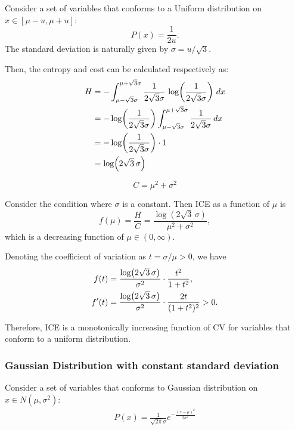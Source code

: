 \documentclass[11pt]{article}
\theoremstyle{remark}
\theoremstyle{definition}
\begin{document}
Consider a set of variables that conforms to a Uniform distribution on $x \in [\mu-u,\mu+u]$:
\begin{equation}
    P(x) = \frac{1}{2u}.
\end{equation}
The standard deviation is naturally given by $\sigma = u/\sqrt{3}$.

Then, the entropy and cost can be calculated respectively as: 
\begin{align}
H 
&= -\int_{\mu-\sqrt{3}\sigma}^{\mu+\sqrt{3}\sigma}
\frac{1}{2\sqrt{3}\sigma}\,
\log\!\left(\frac{1}{2\sqrt{3}\sigma}\right)\,dx \notag \\
&= -\log\!\left(\frac{1}{2\sqrt{3}\sigma}\right)
\int_{\mu-\sqrt{3}\sigma}^{\mu+\sqrt{3}\sigma}\frac{1}{2\sqrt{3}\sigma}\,dx \notag \\
&= -\log\!\left(\frac{1}{2\sqrt{3}\sigma}\right)\cdot 1 \notag \\
&= \log\!\left(2\sqrt{3}\,\sigma\right)
\end{align}

\begin{equation}
C = \mu^2 + \sigma^2
\end{equation}

Consider the condition where $\sigma$ is a constant. Then ICE as a function of $\mu$ is
\begin{equation}
f(\mu) = \frac{H}{C}
= \frac{\log\!\left(2\sqrt{3}\,\sigma\right)}{\mu^2 + \sigma^2},
\end{equation}
which is a decreasing function of $\mu \in (0,\infty)$.

Denoting the coefficient of variation as $t=\sigma/\mu>0$, we have
\begin{align}
f(t) 
&= \frac{\log\!\left(2\sqrt{3}\,\sigma\right)}{\sigma^2}\cdot \frac{t^2}{1+t^2}, \notag \\
f'(t) 
&= \frac{\log\!\left(2\sqrt{3}\,\sigma\right)}{\sigma^2}\cdot \frac{2t}{(1+t^2)^2} > 0.
\end{align}

Therefore, ICE is a monotonically increasing function of CV for variables that conform to a uniform distribution.

\subsubsection{Gaussian Distribution with constant standard deviation}

Consider a set of variables that conforms to Gaussian distribution on $x\in N(\mu,\sigma^2)$:
\begin{align}
    P(x) = \frac{1}{\sqrt{2\pi}\sigma}e^{-\frac{(x-\mu)^2}{2\sigma^2}}
\end{align}
\end{document}

